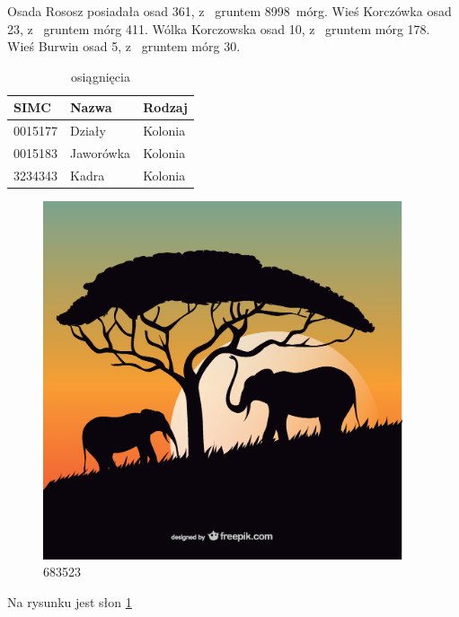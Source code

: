 \documentclass[a4paper,12pt]{article}
\begin{document}
Osada Rososz posiadała osad 361, z~ gruntem 8998~mórg. Wieś Korczówka osad 23, z~ gruntem mórg 411. Wólka Korczowska osad 10, z~ gruntem mórg 178. Wieś Burwin osad 5, z~ gruntem mórg 30.



\begin{table}[h]
\begin{tabular}{lll}
\hline
\textbf{SIMC}&\textbf{Nazwa}&\textbf{Rodzaj}\\
\hline
0015177{}&Działy{}&Kolonia\\
0015183{}&Jaworówka{}&Kolonia\\
3234343{}&Kadra{}&Kolonia\\
\hline
\end{tabular}
\caption{osiągnięcia}
\end{table}
\begin{figure}[ht]
\includegraphics[width=400px, heigh=280px]{683523.eps}
\caption{683523}\label{fig:afryka}
\end{figure}
Na rysunku jest słon \ref {fig:afryka}
\end{document}
